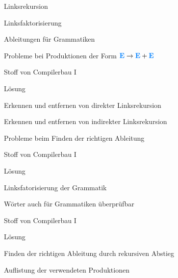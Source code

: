 {
    \begin{itemgroup}{}
	\item Linksrekursion
	\item Linksfaktorisierung
	\item Ableitungen für Grammatiken
    \end{itemgroup}
    
    \vfill{}
}

{
    \begin{itemgroup}{}
	\item Probleme bei Produktionen der Form $\NonterminalSymbol{E} \to
	\NonterminalSymbol{E} + \NonterminalSymbol{E}$
	\item Stoff von Compilerbau I
    \end{itemgroup}

    \begin{itemgroup}{Lösung}
	\item Erkennen und entfernen von direkter Linksrekursion
	\item Erkennen und entfernen von indirekter Linksrekursion
	\end{itemgroup}
    
    \vfill{}
}

{
    \begin{itemgroup}{}
	\item Probleme beim Finden der richtigen Ableitung
	\item Stoff von Compilerbau I
    \end{itemgroup}

    \begin{itemgroup}{Lösung}
	\item Linksfatorisierung der Grammatik
	\end{itemgroup}
    
    \vfill{}
}

{
    \begin{itemgroup}{}
	\item Wörter auch für Grammatiken überprüfbar
	\item Stoff von Compilerbau I
    \end{itemgroup}

    \begin{itemgroup}{Lösung}
	\item Finden der richtigen Ableitung durch rekursiven Abstieg
	\item Auflistung der verwendeten Produktionen
	\end{itemgroup}
    
    \vfill{}
}


